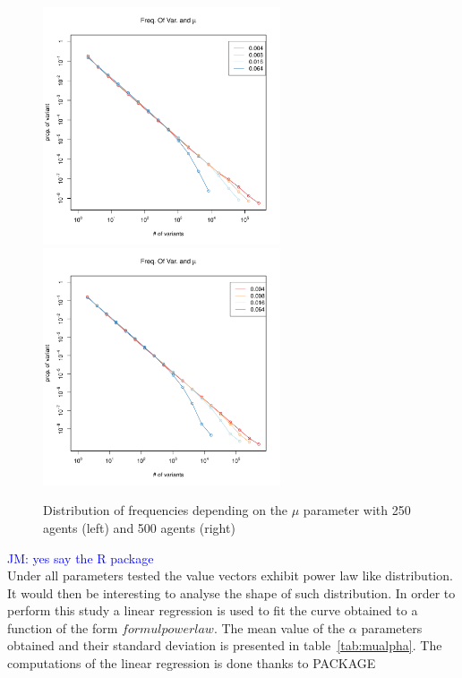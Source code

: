 \documentclass{wscpaperproc}
\newcommand{\memo}[2]{\textcolor{#1}{#2}}
\newcommand{\jm}[1]{\memo{blue}{JM: #1\\}}
\begin{document}
\begin{figure}[hbp]
	\begin{center}
		\includegraphics[width=7cm]{img/allmuRandMaxN250.pdf}
		\includegraphics[width=7cm]{img/allmuRandMaxN500.pdf}
	\end{center}
	\caption{Distribution of frequencies depending on the $\mu$ parameter with 250 agents (left) and 500 agents (right)}
	\label{fig:allMutation }
\end{figure}

\jm{yes say the R package}
Under all parameters tested the value vectors exhibit power law like distribution. It would then be interesting to analyse the shape of such distribution. In order to perform this study a linear regression is used to fit the curve obtained to a function of the form $formul powerlaw$. The mean value of the $\alpha$ parameters obtained and their standard deviation is presented in table~\ref{tab:mualpha}. The computations of the linear regression is done thanks to PACKAGE
\end{document}
